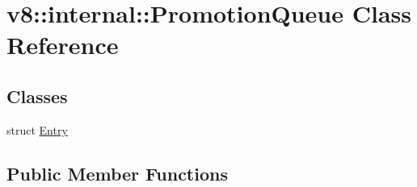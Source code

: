 \hypertarget{classv8_1_1internal_1_1_promotion_queue}{}\section{v8\+:\+:internal\+:\+:Promotion\+Queue Class Reference}
\label{classv8_1_1internal_1_1_promotion_queue}
\subsection*{Classes}
\begin{DoxyCompactItemize}
\item 
struct \hyperlink{structv8_1_1internal_1_1_promotion_queue_1_1_entry}{Entry}
\end{DoxyCompactItemize}
\subsection*{Public Member Functions}
